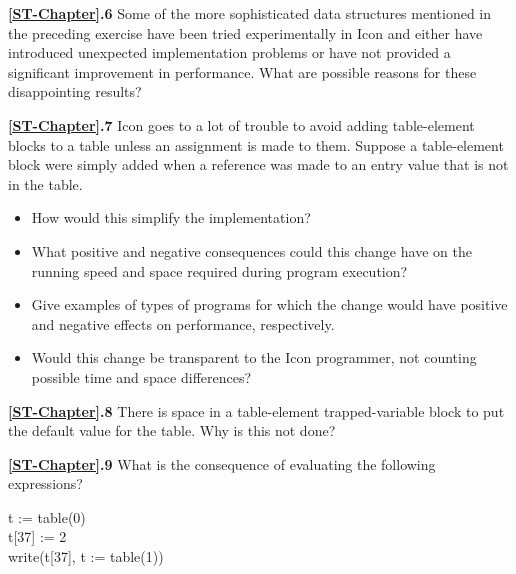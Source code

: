\noindent\textbf{\ref*{ST-Chapter}.6}
Some of the more sophisticated data structures mentioned in the
preceding exercise have been tried experimentally in Icon and either
have introduced unexpected implementation problems or have not
provided a significant improvement in performance. What are possible
reasons for these disappointing results?

\noindent\textbf{\ref*{ST-Chapter}.7}
Icon goes to a lot of trouble to avoid adding table-element
blocks to a table unless an assignment is made to them.  Suppose a
table-element block were simply added when a reference was made to an
entry value that is not in the table.
\begin{itemize}
\item How would this simplify the implementation?

\item What positive and negative consequences could this change have
on the running speed and space required during program execution?

\item Give examples of types of programs for which the change would
have positive and negative effects on performance, respectively.

\item Would this change be transparent to the Icon programmer, not
counting possible time and space differences?
\end{itemize}

\noindent\textbf{\ref*{ST-Chapter}.8}
There is space in a table-element trapped-variable block to put
the default value for the table. Why is this not done?

\noindent\textbf{\ref*{ST-Chapter}.9} 
What is the consequence of evaluating the following expressions?
\begin{iconcode}
\>t := table(0)\\
\>t[37] := 2\\
\>write(t[37], t := table(1))
\end{iconcode}

